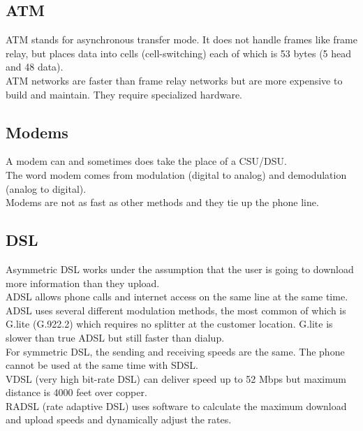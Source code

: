 \subsection{ATM}

ATM stands for asynchronous transfer mode. It does not handle frames like
frame relay, but places data into cells (cell-switching) each of which is 53
bytes (5 head and 48 data).\\

ATM networks are faster than frame relay networks but are more expensive to
build and maintain. They require specialized hardware.

\subsection{Modems}

A modem can and sometimes does take the place of a CSU/DSU.\\

The word modem comes from modulation (digital to analog) and demodulation
(analog to digital).\\

Modems are not as fast as other methods and they tie up the phone line.

\subsection{DSL}

Asymmetric DSL works under the assumption that the user is going to download
more information than they upload.\\

ADSL allows phone calls and internet access on the same line at the same time.\\

ADSL uses several different modulation methods, the most common of which
is G.lite (G.922.2) which requires no splitter at the customer location.
G.lite is slower than true ADSL but still faster than dialup.\\

For symmetric DSL, the sending and receiving speeds are the same. The
phone cannot be used at the same time with SDSL.\\

VDSL (very high bit-rate DSL) can deliver speed up to 52 Mbps but maximum
distance is 4000 feet over copper.\\

RADSL (rate adaptive DSL) uses software to calculate the maximum download
and upload speeds and dynamically adjust the rates.
